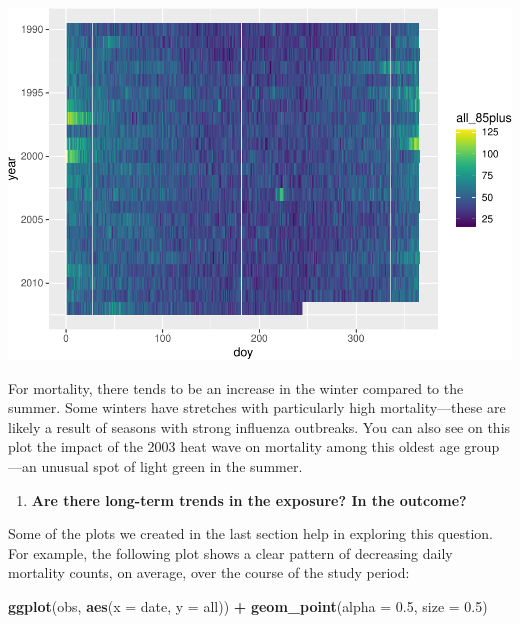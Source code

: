 \documentclass[
]{book}
\newenvironment{Shaded}{\begin{snugshade}}{\end{snugshade}}
\newcommand{\DataTypeTok}[1]{\textcolor[rgb]{0.13,0.29,0.53}{#1}}
\newcommand{\FloatTok}[1]{\textcolor[rgb]{0.00,0.00,0.81}{#1}}
\newcommand{\KeywordTok}[1]{\textcolor[rgb]{0.13,0.29,0.53}{\textbf{#1}}}
\newcommand{\NormalTok}[1]{#1}
\newcommand{\OperatorTok}[1]{\textcolor[rgb]{0.81,0.36,0.00}{\textbf{#1}}}
\newcommand{\StringTok}[1]{\textcolor[rgb]{0.31,0.60,0.02}{#1}}
\providecommand{\tightlist}{%
  \setlength{\itemsep}{0pt}\setlength{\parskip}{0pt}}
\begin{document}
\includegraphics{adv_epi_analysis_files/figure-latex/unnamed-chunk-13-1.pdf}

For mortality, there tends to be an increase in the winter compared to the summer.
Some winters have stretches with particularly high mortality---these are likely
a result of seasons with strong influenza outbreaks. You can also see on this
plot the impact of the 2003 heat wave on mortality among this oldest age group---an
unusual spot of light green in the summer.

\begin{enumerate}
\def\labelenumi{\arabic{enumi}.}
\setcounter{enumi}{3}
\tightlist
\item
  \textbf{Are there long-term trends in the exposure? In the outcome?}
\end{enumerate}

Some of the plots we created in the last section help in exploring this
question. For example, the following plot shows a clear pattern of decreasing
daily mortality counts, on average, over the course of the study period:

\begin{Shaded}
\begin{Highlighting}[]
\KeywordTok{ggplot}\NormalTok{(obs, }\KeywordTok{aes}\NormalTok{(}\DataTypeTok{x =}\NormalTok{ date, }\DataTypeTok{y =}\NormalTok{ all)) }\OperatorTok{+}\StringTok{ }
\StringTok{  }\KeywordTok{geom_point}\NormalTok{(}\DataTypeTok{alpha =} \FloatTok{0.5}\NormalTok{, }\DataTypeTok{size =} \FloatTok{0.5}\NormalTok{)}
\end{Highlighting}
\end{Shaded}
\end{document}
